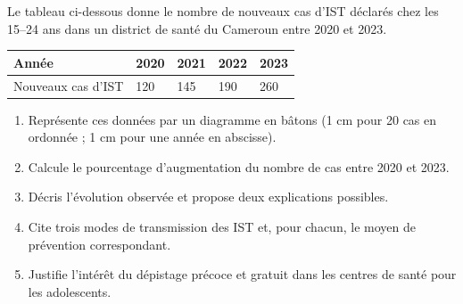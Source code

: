 \documentclass[11pt]{article}
\begin{document}
\begin{exercice}
Le tableau ci-dessous donne le nombre de nouveaux cas d'IST déclarés chez les 15--24 ans dans un district de santé du Cameroun entre 2020 et 2023.

\begin{center}
\begin{tabularx}{\linewidth}{|l|X|X|X|X|}
\hline
\rowcolor{popblueL} \textbf{Année} & \textbf{2020} & \textbf{2021} & \textbf{2022} & \textbf{2023} \\
\hline
Nouveaux cas d'IST & 120 & 145 & 190 & 260 \\
\hline
\end{tabularx}
\end{center}

\begin{enumerate}
\item Représente ces données par un diagramme en bâtons (1 cm pour 20 cas en ordonnée ; 1 cm pour une année en abscisse).
\item Calcule le pourcentage d'augmentation du nombre de cas entre 2020 et 2023.
\item Décris l'évolution observée et propose deux explications possibles.
\item Cite trois modes de transmission des IST et, pour chacun, le moyen de prévention correspondant.
\item Justifie l'intérêt du dépistage précoce et gratuit dans les centres de santé pour les adolescents.
\end{enumerate}
\end{exercice}
\end{document}
